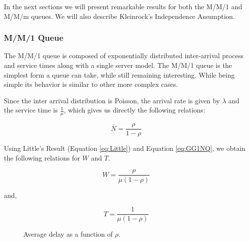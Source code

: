 In the next sections we will present remarkable results for both the M/M/1 and M/M/m queues. We will also describe Kleinrock's Independence Assumption. 

\subsubsection{M/M/1 Queue}

The M/M/1 queue is composed of exponentially distributed inter-arrival process and service times along with a single server model. The M/M/1 queue is the simplest form a queue can take, while still remaining interesting. While being simple its behavior is similar to other more complex cases. 

Since the inter arrival distribution is Poisson, the arrival rate is given by $\lambda$ and the service time is $\frac{1}{\mu}$, which gives us directly the following relations:

\begin{equation}
\bar{N} = \frac{\rho}{1-\rho}
\label{eq:MM1N}
\end{equation}
 
Using Little's Result (Equation \ref{eq:Little}) and Equation \ref{eq:GG1NQ}, we obtain the following relations for $W$ and $T$.

\begin{equation}
W = \frac{\rho}{\mu(1-\rho)} 
\label{eq:MM1W}
\end{equation}

and,

\begin{equation}
T = \frac{1}{\mu(1-\rho)}
\label{eq:MM1T}
\end{equation}

\begin{figure}[htbp!]
\begin{center}

\end{center}
\caption{Average delay as a function of $\rho$.}
\label{fig:MM1INF}
\end{figure}

